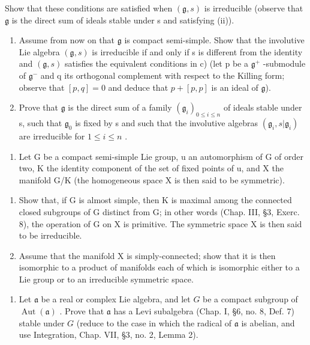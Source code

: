 Show that these conditions are satisfied when \((\mathfrak{g}, s)\) is irreducible (observe that \(\mathfrak{g}\) is the direct sum of ideals stable under s and satisfying (ii)).

\begin{enumerate}
\def\labelenumi{\alph{enumi})}
\setcounter{enumi}{3}
\item
  Assume from now on that \(\mathfrak{g}\) is compact semi-simple. Show that the involutive Lie algebra \((\mathfrak{g}, s)\) is irreducible if and only if s is different from the identity and \((\mathfrak{g}, s)\) satisfies the equivalent conditions in c) (let p be a \(\mathfrak{g}^{+}\) -submodule of \(\mathfrak{g}^{-}\) and q its orthogonal complement with respect to the Killing form; observe that \([p, q] = 0\) and deduce that \(p + [p, p]\) is an ideal of \(\mathfrak{g}\)).
\item
  Prove that \(\mathfrak{g}\) is the direct sum of a family \((\mathfrak{g}_{i})_{0\leq i\leq n}\) of ideals stable under s, such that \(\mathfrak{g}_{0}\) is fixed by s and such that the involutive algebras \((\mathfrak{g}_{i},s|\mathfrak{g}_{i})\) are irreducible for \(1\leq i\leq n\) .
\end{enumerate}

\begin{enumerate}
\def\labelenumi{\arabic{enumi})}
\setcounter{enumi}{7}
\tightlist
\item
  Let G be a compact semi-simple Lie group, u an automorphism of G of order two, K the identity component of the set of fixed points of u, and X the manifold G/K (the homogeneous space X is then said to be symmetric).
\end{enumerate}

\begin{enumerate}
\def\labelenumi{\alph{enumi})}
\item
  Show that, if G is almost simple, then K is maximal among the connected closed subgroups of G distinct from G; in other words (Chap. III, §3, Exerc. 8), the operation of G on X is primitive. The symmetric space X is then said to be irreducible.
\item
  Assume that the manifold X is simply-connected; show that it is then isomorphic to a product of manifolds each of which is isomorphic either to a Lie group or to an irreducible symmetric space.
\end{enumerate}

\begin{enumerate}
\def\labelenumi{\arabic{enumi})}
\setcounter{enumi}{8}
\tightlist
\item
  Let \(\mathfrak{a}\) be a real or complex Lie algebra, and let \(G\) be a compact subgroup of \(\operatorname{Aut}(\mathfrak{a})\) . Prove that \(\mathfrak{a}\) has a Levi subalgebra (Chap. I, §6, no. 8, Def. 7) stable under \(G\) (reduce to the case in which the radical of \(\mathfrak{a}\) is abelian, and use Integration, Chap. VII, §3, no. 2, Lemma 2).
\end{enumerate}


